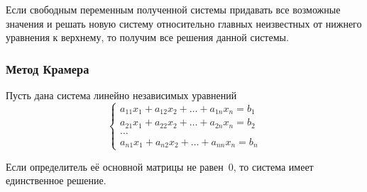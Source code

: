 Если свободным переменным полученной системы придавать все возможные значения и решать новую систему относительно главных неизвестных от нижнего уравнения к верхнему, то получим все решения данной системы.

\subsubsection{Метод Крамера}
\begin{theorem}[Крамера]
\label{th:Cramer}
Пусть дана система линейно независимых уравнений
\begin{equation*}
\begin{cases}
a_{11}x_1 + a_{12}x_2 + \dots + a_{1n}x_n = b_1 \\
a_{21}x_1 + a_{22}x_2 + \dots + a_{2n}x_n = b_2 \\
\ldots \\
a_{n1}x_1 + a_{n2}x_2 + \dots + a_{nn}x_n = b_n
\end{cases}
\end{equation*}

Если определитель её основной матрицы не равен~$0$, то система имеет единственное решение.
\end{theorem}
